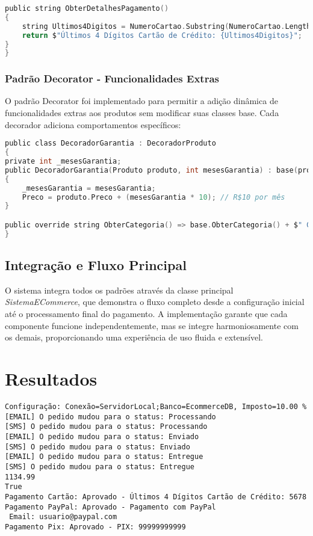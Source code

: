 \documentclass[
	12pt,				%
	oneside,			%
	a4paper,			%
	english,			%
	brazil,				%
	]{abntex2}
\begin{document}
{\begin{lstlisting}[language=C]
public string ObterDetalhesPagamento()
{
    string Ultimos4Digitos = NumeroCartao.Substring(NumeroCartao.Length - 4);
    return $"Últimos 4 Dígitos Cartão de Crédito: {Ultimos4Digitos}";
}
}
\end{lstlisting}
\subsubsection{Padrão Decorator - Funcionalidades Extras}
O padrão Decorator foi implementado para permitir a adição dinâmica de funcionalidades extras aos produtos sem modificar suas classes base. Cada decorador adiciona comportamentos específicos:
\begin{lstlisting}[language=C]
public class DecoradorGarantia : DecoradorProduto
{
private int _mesesGarantia;
public DecoradorGarantia(Produto produto, int mesesGarantia) : base(produto)
{
    _mesesGarantia = mesesGarantia;
    Preco = produto.Preco + (mesesGarantia * 10); // R$10 por mês
}

public override string ObterCategoria() => base.ObterCategoria() + $" Garantia de {_mesesGarantia}";
}
\end{lstlisting}
\subsection{Integração e Fluxo Principal}
O sistema integra todos os padrões através da classe principal \textit{SistemaECommerce}, que demonstra o fluxo completo desde a configuração inicial até o processamento final do pagamento. A implementação garante que cada componente funcione independentemente, mas se integre harmoniosamente com os demais, proporcionando uma experiência de uso fluida e extensível.
\section{Resultados}

\begin{verbatim}
Configuração: Conexão=ServidorLocal;Banco=EcommerceDB, Imposto=10.00 %
[EMAIL] O pedido mudou para o status: Processando
[SMS] O pedido mudou para o status: Processando
[EMAIL] O pedido mudou para o status: Enviado
[SMS] O pedido mudou para o status: Enviado
[EMAIL] O pedido mudou para o status: Entregue
[SMS] O pedido mudou para o status: Entregue
1134.99
True
Pagamento Cartão: Aprovado - Últimos 4 Dígitos Cartão de Crédito: 5678
Pagamento PayPal: Aprovado - Pagamento com PayPal 
 Email: usuario@paypal.com
Pagamento Pix: Aprovado - PIX: 99999999999
\end{verbatim}

}
\end{document}
